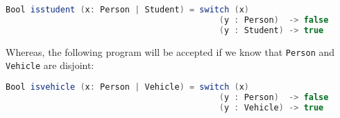 \begin{lstlisting}[language=Scala]
  Bool isstudent (x: Person | Student) = switch (x)
                                           (y : Person)  -> false
                                           (y : Student) -> true
\end{lstlisting}

\noindent Whereas, the following program will be accepted
if we know that \lstinline{Person} and \lstinline{Vehicle} are disjoint:

\begin{lstlisting}[language=Scala]
  Bool isvehicle (x: Person | Vehicle) = switch (x)
                                           (y : Person)  -> false
                                           (y : Vehicle) -> true
\end{lstlisting}

\begin{comment}
For example, in the expression:
%

\[(\lambda x . x : [[Int]] \to ([[Int \/ String]]))~1\]

\noindent if the result of reduction would simply be $[[1]]$, then some
static information would be lost, because the type of $[[1]]$ is $[[Int]]$,
but the static type of the original expression is $[[Int \/ String]]$.
In other words, the original type would not be preserved: we
would get a \emph{subtype} instead. This phenomenon is of course well-known
in OOP languages and languages with subtyping, where often preservation
needs to be weakened to allow the type after reduction to be a subtype.
For instance, in Featherweight Java~\cite{DBLP:journals/toplas/IgarashiPW01}
the preservation theorem states that the type after reduction is a
subtype (and not necessarily the original type of the expression). In our
operational semantics we opted to keep track of the static types instead,
and preserve the original type. Thus the resulting value is $[[1 : Int \/ String]]$.
This considerably simplifies the metatheory, although in an actual
implementation not tracking the static type would be more efficient.
\end{comment}




